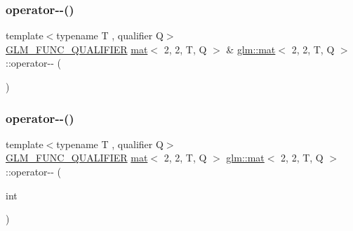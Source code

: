 \subsubsection{\texorpdfstring{operator-\/-\/()}{operator--()}\hspace{0.1cm}{\footnotesize\ttfamily [1/2]}}
{\footnotesize\ttfamily template$<$typename T , qualifier Q$>$ \\
\hyperlink{setup_8hpp_a33fdea6f91c5f834105f7415e2a64407}{G\+L\+M\+\_\+\+F\+U\+N\+C\+\_\+\+Q\+U\+A\+L\+I\+F\+I\+ER} \hyperlink{structglm_1_1mat}{mat}$<$ 2, 2, T, Q $>$ \& \hyperlink{structglm_1_1mat}{glm\+::mat}$<$ 2, 2, T, Q $>$\+::operator-\/-\/ (\begin{DoxyParamCaption}{ }\end{DoxyParamCaption})}

\mbox{\label{structglm_1_1mat_3_012_00_012_00_01_t_00_01_q_01_4_a281b447bee6e5873f04b693d7178da91}} 
\subsubsection{\texorpdfstring{operator-\/-\/()}{operator--()}\hspace{0.1cm}{\footnotesize\ttfamily [2/2]}}
{\footnotesize\ttfamily template$<$typename T , qualifier Q$>$ \\
\hyperlink{setup_8hpp_a33fdea6f91c5f834105f7415e2a64407}{G\+L\+M\+\_\+\+F\+U\+N\+C\+\_\+\+Q\+U\+A\+L\+I\+F\+I\+ER} \hyperlink{structglm_1_1mat}{mat}$<$ 2, 2, T, Q $>$ \hyperlink{structglm_1_1mat}{glm\+::mat}$<$ 2, 2, T, Q $>$\+::operator-\/-\/ (\begin{DoxyParamCaption}\item[{int}]{ }\end{DoxyParamCaption})}

\mbox{\label{structglm_1_1mat_3_012_00_012_00_01_t_00_01_q_01_4_aecdeb6c1dc9896a5e3245fbdf4cd55de}} 
